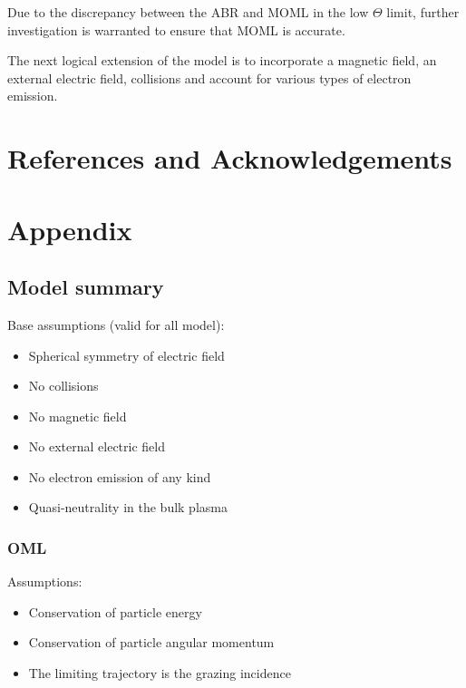 \documentclass[journal]{Imperial_lab_report}
\begin{document}
\smallskip

Due to the discrepancy between the ABR and MOML in the low $\Theta$ limit, further investigation is warranted to ensure that MOML is accurate.

\smallskip

The next logical extension of the model is to incorporate a magnetic field, an external electric field, collisions and account for various types of electron emission.


\section{References and Acknowledgements}



\section{Appendix}

\subsection{Model summary}

\medskip

Base assumptions (valid for all model):

\medskip

\begin{itemize}
\item Spherical symmetry of electric field
\item No collisions
\item No magnetic field
\item No external electric field
\item No electron emission of any kind 
\item Quasi-neutrality in the bulk plasma
\end{itemize}

\medskip

\subsubsection{OML}

\medskip

Assumptions:

\medskip

\begin{itemize}
\item Conservation of particle energy
\item Conservation of particle angular momentum
\item The limiting trajectory is the grazing incidence 
\end{itemize}
\end{document}
